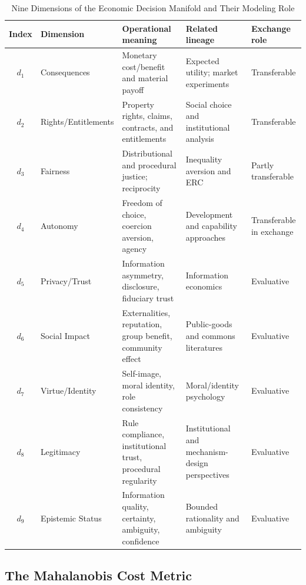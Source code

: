 \documentclass[journal]{IEEEtran}
\providecommand{\DIFaddbegin}{} %
\providecommand{\DIFaddend}{} %
\providecommand{\DIFdelend}{} %
\providecommand{\DIFaddincludegraphics}[2][]{{\color{blue}\fbox{\DIFOincludegraphics[#1]{#2}}}} %
\DeclareRobustCommand{\DIFaddbegin}{\DIFOaddbegin \let\includegraphics\DIFaddincludegraphics} %
\DeclareRobustCommand{\DIFaddend}{\DIFOaddend \let\includegraphics\DIFOincludegraphics} %
\DeclareRobustCommand{\DIFdelend}{\DIFOaddend \let\includegraphics\DIFOincludegraphics} %
\begin{document}
\DIFdelend \DIFaddbegin \begin{table}[!t]
\renewcommand{\arraystretch}{1.15}
\caption{Nine Dimensions of the Economic Decision Manifold and Their Modeling Role}
\label{tab:dimensions}
\centering
\begin{tabular}{c p{} p{} p{} p{}}
\toprule
\textbf{Index} & \textbf{Dimension} & \textbf{Operational meaning} & \textbf{Related lineage} & \textbf{Exchange role} \\
\midrule
$d_1$ & Consequences & Monetary cost/benefit and material payoff & Expected utility; market experiments~\cite{vonneumann1944,smith1962} & Transferable \\
$d_2$ & Rights/Entitlements & Property rights, claims, contracts, and entitlements & Social choice and institutional analysis~\cite{arrow1951,ostrom1990} & Transferable \\
$d_3$ & Fairness & Distributional and procedural justice; reciprocity & Inequality aversion and ERC~\cite{fehr1999,bolton2000} & Partly transferable \\
$d_4$ & Autonomy & Freedom of choice, coercion aversion, agency & Development and capability approaches~\cite{sen1999} & Transferable in exchange \\
$d_5$ & Privacy/Trust & Information asymmetry, disclosure, fiduciary trust & Information economics~\cite{akerlof1970,stiglitz1981} & Evaluative \\
$d_6$ & Social Impact & Externalities, reputation, group benefit, community effect & Public-goods and commons literatures~\cite{ostrom1990,camerer2003} & Evaluative \\
$d_7$ & Virtue/Identity & Self-image, moral identity, role consistency & Moral/identity psychology~\cite{haidt2012,tetlock2000} & Evaluative \\
$d_8$ & Legitimacy & Rule compliance, institutional trust, procedural regularity & Institutional and mechanism-design perspectives~\cite{ostrom1990,thaler2008} & Evaluative \\
$d_9$ & Epistemic Status & Information quality, certainty, ambiguity, confidence & Bounded rationality and ambiguity~\cite{simon1955,ellsberg1961} & Evaluative \\
\bottomrule
\end{tabular}
\end{table}
\DIFaddend 

\subsection{The Mahalanobis Cost Metric}
\end{document}
